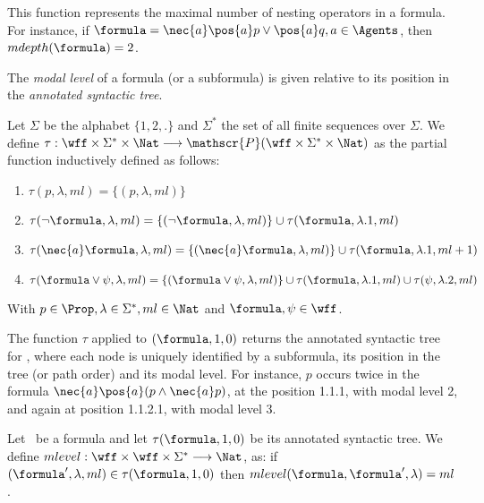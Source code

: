 This function represents the maximal number of nesting operators in a formula.
For instance, if $\formula = \nec{a}\pos{a} p \lor \pos{a} q, a \in \Agents$,
then $mdepth(\formula) = 2$.

The \emph{modal level} of a formula (or a subformula) is given relative to its position in the
\emph{annotated syntactic tree}.

\begin{definition}%
    Let $\Sigma$ be the alphabet $\{1, 2, .\}$ and $\Sigma^*$ the set of all
    finite sequences over $\Sigma$. 
    We define $\tau : \wff \times \Sigma^* \times \Nat
    \longrightarrow \mathscr{P}(\wff \times \Sigma^* \times \Nat)$ as the
    partial function inductively defined as follows:
    \begin{enumerate}
        \item $\tau(p, \lambda, ml) = \{(p, \lambda, ml)\}$
        \item $\tau(\neg \formula, \lambda, ml) = \{(\neg \formula, \lambda, ml)\} \cup \tau(\formula, \lambda.1, ml)$
        \item $\tau(\nec{a} \formula, \lambda, ml) = \{(\nec{a} \formula, \lambda, ml)\} \cup \tau(\formula, \lambda.1, ml + 1)$
        \item $\tau(\formula \lor \psi, \lambda, ml) = \{(\formula \lor \psi, \lambda, ml)\} \cup \tau(\formula, \lambda.1, ml) \cup \tau(\psi, \lambda.2, ml)$
    \end{enumerate}
    With $p \in \Prop, \lambda \in \Sigma^*, ml \in \Nat$ and $\formula, \psi
    \in \wff$.
\end{definition}

The function $\tau$ applied to $(\formula, 1, 0)$ returns the
annotated syntactic tree for \formula, where each node is uniquely identified by
a subformula, its position in the tree (or path order) and its modal level. For
instance, $p$ occurs twice in the formula $\nec{a}\pos{a}(p \land \nec{a} p)$,
at the position 1.1.1, with modal level 2, and again at position
1.1.2.1, with modal level 3.

\begin{definition}
    Let \formula~be a formula and let $\tau(\formula, 1, 0)$ be its
    annotated syntactic tree. We define $mlevel : \wff \times \wff \times \Sigma^*
    \longrightarrow \Nat$, as: if $(\formula', \lambda, ml)\in \tau(\formula,
    1, 0)$ then $mlevel(\formula, \formula', \lambda) = ml$.
\end{definition}

